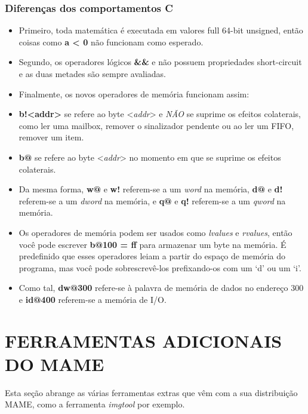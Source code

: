 \documentclass[letterpaper,10pt,brazil]{sphinxmanual}
\begin{document}
\subsection{Diferenças dos comportamentos C}
\label{debugger/expressions:diferencas-dos-comportamentos-c}\begin{itemize}
\item {} 
Primeiro, toda matemática é executada em valores full 64-bit unsigned,
então coisas como \textbf{a \textless{} 0} não funcionam como esperado.

\item {} 
Segundo, os operadores lógicos \textbf{\&\&} e \textbf{\textbar{}\textbar{}} não possuem
propriedades short-circuit e as duas metades são sempre avaliadas.

\item {} 
Finalmente, os novos operadores de memória funcionam assim:

\item {} 
\textbf{b!\textless{}addr\textgreater{}} se refere ao byte \textless{}\emph{addr}\textgreater{} e \emph{NÃO} se suprime os efeitos
colaterais, como ler uma mailbox, remover o sinalizador pendente ou ao ler um FIFO, remover um item.

\item {} 
\textbf{b@} se refere ao byte \textless{}\emph{addr}\textgreater{} no momento em que se suprime os
efeitos colaterais.

\item {} 
Da mesma forma, \textbf{w@} e \textbf{w!} referem-se a um \emph{word} na memória,
\textbf{d@} e \textbf{d!} referem-se a um \emph{dword} na memória, e \textbf{q@} e \textbf{q!}
referem-se a um \emph{qword} na memória.

\item {} 
Os operadores de memória podem ser usados como \emph{lvalues} e \emph{rvalues},
então você pode escrever \textbf{b@100 = ff} para armazenar um byte na
memória. É predefinido que esses operadores leiam a partir do espaço
de memória do programa, mas você pode sobrescrevê-los prefixando-os
com um `d' ou um `i'.

\item {} 
Como tal, \textbf{dw@300} refere-se à palavra de memória de dados no
endereço 300 e \textbf{id@400} referem-se a memória de I/O.

\end{itemize}


\chapter{FERRAMENTAS ADICIONAIS DO MAME}
\label{tools/index:ferramentas-adicionais-do-mame}\label{tools/index::doc}
Esta seção abrange as várias ferramentas extras que vêm com a sua
distribuição MAME, como a ferramenta \emph{imgtool} por exemplo.
\end{document}
